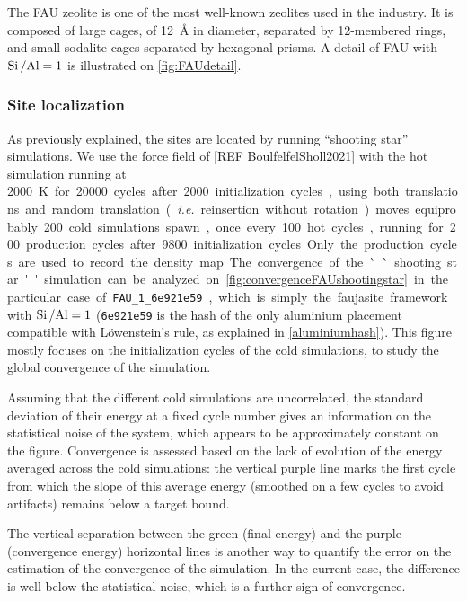\documentclass[main.tex]{subfiles}
\begin{document}
The FAU zeolite is one of the most well-known zeolites used in the industry. It is composed of large cages, of \qty{12}{\angstrom} in diameter, separated by 12-membered rings, and small sodalite cages separated by hexagonal prisms. A detail of FAU with $\mbox{Si\,/Al} = 1$ is illustrated on \cref{fig:FAUdetail}.

\subsubsection{Site localization}

As previously explained, the sites are located by running ``shooting star'' simulations. We use the force field of [REF BoulfelfelSholl2021] with the hot simulation running at \qty{2000}K for \num{20000} cycles after \num{2000} initialization cycles, using both translations and random translation (\textit{i.e.} reinsertion without rotation) moves equiprobably. \num{200} cold simulations spawn, once every \num{100} hot cycles, running for \num{200} production cycles after \num{9800} initialization cycles. Only the production cycles are used to record the density map.

The convergence of the ``shooting star'' simulation can be analyzed on \cref{fig:convergenceFAUshootingstar} in the particular case of \texttt{FAU\_1\_6e921e59}, which is simply the faujasite framework with $\mbox{Si\,/Al} = 1$ (\texttt{6e921e59} is the hash of the only aluminium placement compatible with L\"owenstein's rule, as explained in \cref{aluminiumhash}). This figure mostly focuses on the initialization cycles of the cold simulations, to study the global convergence of the simulation.

Assuming that the different cold simulations are uncorrelated, the standard deviation of their energy at a fixed cycle number gives an information on the statistical noise of the system, which appears to be approximately constant on the figure. Convergence is assessed based on the lack of evolution of the energy averaged across the cold simulations: the vertical purple line marks the first cycle from which the slope of this average energy (smoothed on a few cycles to avoid artifacts) remains below a target bound.

The vertical separation between the green (final energy) and the purple (convergence energy) horizontal lines is another way to quantify the error on the estimation of the convergence of the simulation. In the current case, the difference is well below the statistical noise, which is a further sign of convergence.
\end{document}
